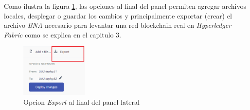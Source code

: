 Como ilustra la figura \ref{fig: playground-define-export}, las opciones al final del panel permiten agregar archivos locales, desplegar o guardar los cambios y principalmente exportar (crear) el archivo \textit{BNA} necesario para levantar una red blockchain real en \textit{Hyperledger Fabric} como se explica en el capitulo 3.
\begin{figure}[H]
\centering
\includegraphics[width=0.3\textwidth]{playground9.png}
\caption[Define Export Playground]{Opcion \textit{Export} al final del panel lateral}
\label{fig: playground-define-export}
\end{figure}

